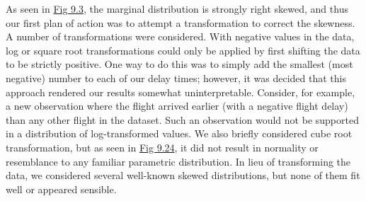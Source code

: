 \documentclass[12pt, a4paper, openany]{book}
\newcommand\tab[1][1cm]{\hspace*{#1}}
\begin{document}
	\tab As seen in \underline{Fig 9.3}, the marginal distribution is strongly right skewed, and thus our first plan of action was to attempt a transformation to correct the skewness. A number of transformations were considered. With negative values in the data, log or square root transformations could only be applied by first shifting the data to be strictly positive. One way to do this was to simply add the smallest (most negative) number to each of our delay times; however, it was decided that this approach rendered our results somewhat uninterpretable. Consider, for example, a new observation where the flight arrived earlier (with a negative flight delay) than any other flight in the dataset. Such an observation would not be supported in a distribution of log-transformed values. We also briefly considered cube root transformation, but as seen in \underline{Fig 9.24}, it did not result in normality or resemblance to any familiar parametric distribution. In lieu of transforming the data, we considered several well-known skewed distributions, but none of them fit well or appeared sensible.\\
\end{document}
